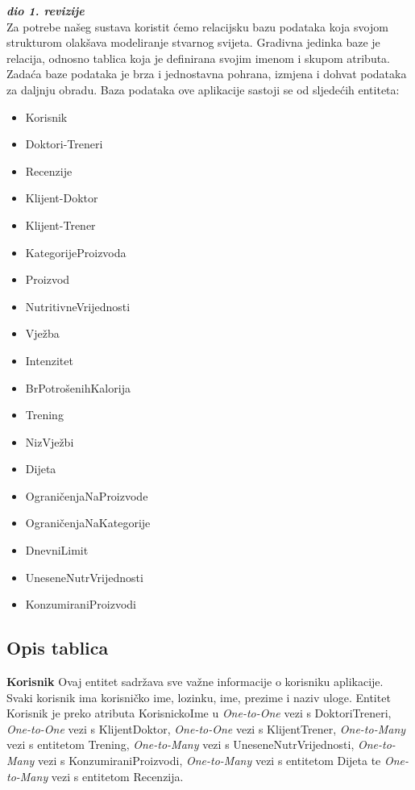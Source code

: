 			\textbf{\textit{dio 1. revizije}}\\
			Za potrebe našeg sustava koristit ćemo relacijsku bazu podataka koja svojom strukturom olakšava modeliranje stvarnog svijeta. Gradivna jedinka baze je relacija, odnosno tablica koja je definirana svojim imenom i skupom atributa. Zadaća baze podataka je brza i jednostavna pohrana, izmjena i dohvat podataka za daljnju obradu.
			Baza podataka ove aplikacije sastoji se od sljedećih entiteta:
			\begin{itemize}
				\item {Korisnik}
				\item {Doktori-Treneri}
				\item {Recenzije}
				\item {Klijent-Doktor}
				\item {Klijent-Trener}
				\item {KategorijeProizvoda}
				\item {Proizvod}
				\item {NutritivneVrijednosti}
				\item {Vježba}
				\item {Intenzitet}
				\item {BrPotrošenihKalorija}
				\item {Trening}
				\item {NizVježbi}
				\item {Dijeta}
				\item {OgraničenjaNaProizvode}
				\item {OgraničenjaNaKategorije}
				\item {DnevniLimit}
				\item {UneseneNutrVrijednosti}
				\item {KonzumiraniProizvodi}
			\end{itemize}
			
			
		
			\subsection{Opis tablica}
			

				\textbf{Korisnik} Ovaj entitet sadržava sve važne informacije o korisniku aplikacije. Svaki korisnik ima korisničko ime, lozinku, ime, prezime i naziv uloge. Entitet Korisnik je preko atributa KorisnickoIme u \textit{One-to-One} vezi s DoktoriTreneri, \textit{One-to-One} vezi s KlijentDoktor, \textit{One-to-One} vezi s KlijentTrener, \textit{One-to-Many} vezi s entitetom Trening, \textit{One-to-Many} vezi s UneseneNutrVrijednosti, \textit{One-to-Many} vezi s KonzumiraniProizvodi, \textit{One-to-Many} vezi s entitetom Dijeta te \textit{One-to-Many} vezi s entitetom Recenzija.
				
